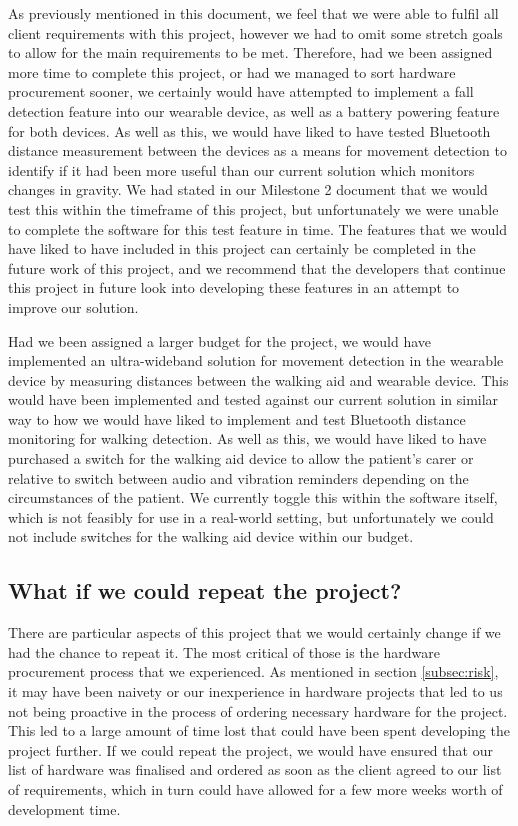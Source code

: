             As previously mentioned in this document, we feel that we were able to fulfil all client requirements with this project, however we had to omit some stretch goals to allow for the main requirements to be met. Therefore, had we been assigned more time to complete this project, or had we managed to sort hardware procurement sooner, we certainly would have attempted to implement a fall detection feature into our wearable device, as well as a battery powering feature for both devices. As well as this, we would have liked to have tested Bluetooth distance measurement between the devices as a means for movement detection to identify if it had been more useful than our current solution which monitors changes in gravity. We had stated in our Milestone 2 document \cite{mile2} that we would test this within the timeframe of this project, but unfortunately we were unable to complete the software for this test feature in time. The features that we would have liked to have included in this project can certainly be completed in the future work of this project, and we recommend that the developers that continue this project in future look into developing these features in an attempt to improve our solution.

            Had we been assigned a larger budget for the project, we would have implemented an ultra-wideband solution for movement detection in the wearable device by measuring distances between the walking aid and wearable device. This would have been implemented and tested against our current solution in similar way to how we would have liked to implement and test Bluetooth distance monitoring for walking detection. As well as this, we would have liked to have purchased a switch for the walking aid device to allow the patient's carer or relative to switch between audio and vibration reminders depending on the circumstances of the patient. We currently toggle this within the software itself, which is not feasibly for use in a real-world setting, but unfortunately we could not include switches for the walking aid device within our budget.

        \subsection{What if we could repeat the project?}

            There are particular aspects of this project that we would certainly change if we had the chance to repeat it. The most critical of those is the hardware procurement process that we experienced. As mentioned in section \ref{subsec:risk}, it may have been naivety or our inexperience in hardware projects that led to us not being proactive in the process of ordering necessary hardware for the project. This led to a large amount of time lost that could have been spent developing the project further. If we could repeat the project, we would have ensured that our list of hardware was finalised and ordered as soon as the client agreed to our list of requirements, which in turn could have allowed for a few more weeks worth of development time.

